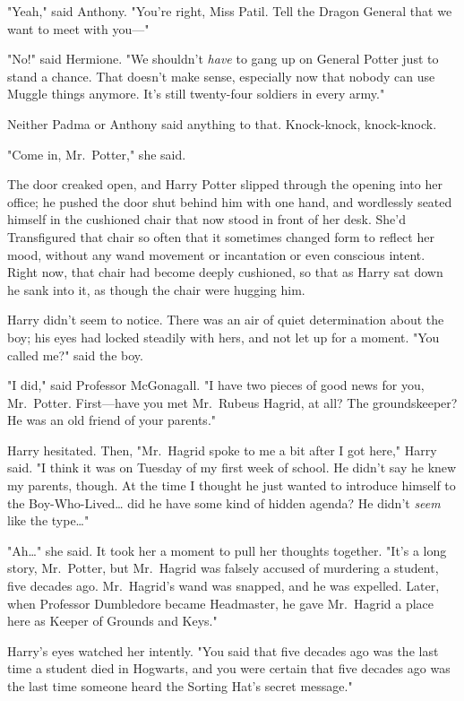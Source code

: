 "Yeah," said Anthony. "You're right, Miss Patil. Tell the Dragon General that 
we want to meet with you---"

"No!" said Hermione. "We shouldn't \emph{have} to gang up on General Potter 
just to stand a chance. That doesn't make sense, especially now that nobody can 
use Muggle things anymore. It's still twenty-four soldiers in every army."

Neither Padma or Anthony said anything to that.
\sbreak
Knock-knock, knock-knock.

"Come in, Mr.~Potter," she said.

The door creaked open, and Harry Potter slipped through the opening into her 
office; he pushed the door shut behind him with one hand, and wordlessly seated 
himself in the cushioned chair that now stood in front of her desk. She'd 
Transfigured that chair so often that it sometimes changed form to reflect her 
mood, without any wand movement or incantation or even conscious intent. Right 
now, that chair had become deeply cushioned, so that as Harry sat down he sank 
into it, as though the chair were hugging him.

Harry didn't seem to notice. There was an air of quiet determination about the 
boy; his eyes had locked steadily with hers, and not let up for a moment. "You 
called me?" said the boy.

"I did," said Professor McGonagall. "I have two pieces of good news for you, 
Mr.~Potter. First---have you met Mr.~Rubeus Hagrid, at all? The groundskeeper? 
He was an old friend of your parents."

Harry hesitated. Then, "Mr.~Hagrid spoke to me a bit after I got here," Harry 
said. "I think it was on Tuesday of my first week of school. He didn't say he 
knew my parents, though. At the time I thought he just wanted to introduce 
himself to the Boy-Who-Lived{\ldots} did he have some kind of hidden agenda? He 
didn't \emph{seem} like the type{\ldots}"

"Ah{\ldots}" she said. It took her a moment to pull her thoughts together. 
"It's a long story, Mr.~Potter, but Mr.~Hagrid was falsely accused of murdering 
a student, five decades ago. Mr.~Hagrid's wand was snapped, and he was 
expelled. Later, when Professor Dumbledore became Headmaster, he gave 
Mr.~Hagrid a place here as Keeper of Grounds and Keys."

Harry's eyes watched her intently. "You said that five decades ago was the last 
time a student died in Hogwarts, and you were certain that five decades ago was 
the last time someone heard the Sorting Hat's secret message."

